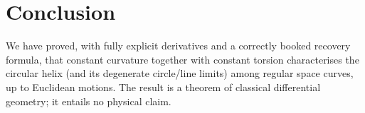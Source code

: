 \documentclass[11pt]{article}
\begin{document}
\section{Conclusion}
\label{sec:con}

We have proved, with fully explicit derivatives and a correctly booked
recovery formula, that constant curvature together with constant torsion
characterises the circular helix (and its degenerate circle/line limits) among
regular space curves, up to Euclidean motions. The result is a theorem of
classical differential geometry; it entails no physical claim.
\end{document}
